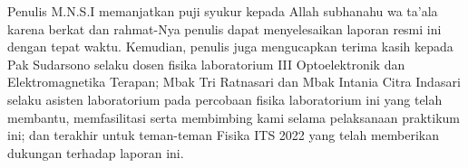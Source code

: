 
Penulis M.N.S.I memanjatkan puji syukur kepada Allah subhanahu wa ta'ala
karena berkat dan rahmat-Nya penulis dapat menyelesaikan laporan resmi ini
dengan tepat waktu. Kemudian, penulis juga mengucapkan terima kasih kepada
Pak Sudarsono selaku dosen fisika laboratorium III Optoelektronik dan
Elektromagnetika Terapan; Mbak Tri Ratnasari dan Mbak Intania Citra Indasari
selaku asisten laboratorium pada percobaan fisika laboratorium ini yang telah
membantu, memfasilitasi serta membimbing kami selama pelaksanaan praktikum
ini; dan terakhir untuk teman-teman Fisika ITS 2022 yang telah memberikan
dukungan terhadap laporan ini.
